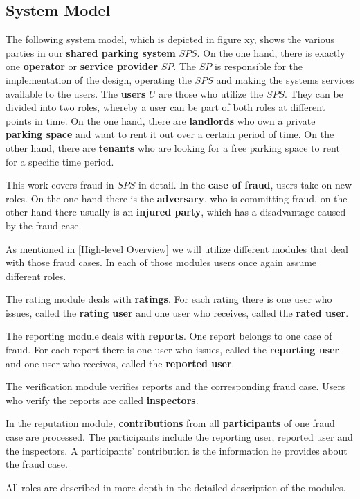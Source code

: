 \documentclass[
a4paper,     %
titlepage,   %
14pt         %
]{scrartcl}  %
\theoremstyle{mystyle}
\begin{document}
\subsection{System Model}\label{System Model}
The following system model, which is depicted in figure xy, shows the various parties in our \textbf{shared parking system} $SPS$. On the one hand, there is exactly one \textbf{operator} or \textbf{service provider} $SP$. The $SP$ is responsible for the implementation of the design, operating the $SPS$ and making the systems services available to the users. The \textbf{users} $U$ are those who utilize the $SPS$. They can be divided into two roles, whereby a user can be part of both roles at different points in time. On the one hand, there are \textbf{landlords} who own a private \textbf{parking space} and want to rent it out over a certain period of time. On the other hand, there are \textbf{tenants} who are looking for a free parking space to rent for a specific time period.

This work covers fraud in $SPS$ in detail. In the \textbf{case of fraud}, users take on new roles. On the one hand there is the \textbf{adversary}, who is committing fraud, on the other hand there usually is an \textbf{injured party}, which has a disadvantage caused by the fraud case.

As mentioned in \ref{High-level Overview} we will utilize different modules that deal with those fraud cases. In each of those modules users once again assume different roles.

The rating module deals with \textbf{ratings}. For each rating there is one user who issues, called the\textbf{ rating user} and one user who receives, called the \textbf{rated user}.

The reporting module deals with \textbf{reports}. One report belongs to one case of fraud. For each report there is one user who issues, called the \textbf{reporting user} and one user who receives, called the \textbf{reported user}.

The verification module verifies reports and the corresponding fraud case. Users who verify the reports are called \textbf{inspectors}.

In the reputation module, \textbf{contributions} from all \textbf{participants} of one fraud case are processed. The participants include the reporting user, reported user and the inspectors. A participants' contribution is the information he provides about the fraud case.

All roles are described in more depth in the detailed description of the modules.\\
\end{document}
